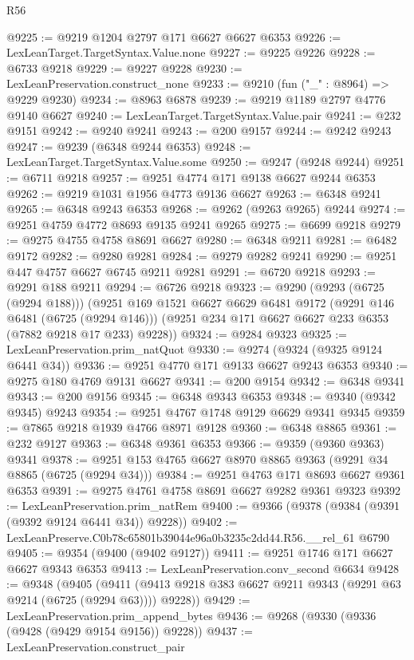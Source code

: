 \begin{lexlean}{R56}
\begin{coremodule}
@9225 := @9219 @1204 @2797 @171 @6627 @6627 @6353
@9226 := LexLeanTarget.TargetSyntax.Value.none
@9227 := @9225 @9226
@9228 := @6733 @9218
@9229 := @9227 @9228
@9230 := LexLeanPreservation.construct_none
@9233 := @9210 (fun ("_" : @8964) => @9229 @9230)
@9234 := @8963 @6878
@9239 := @9219 @1189 @2797 @4776 @9140 @6627
@9240 := LexLeanTarget.TargetSyntax.Value.pair
@9241 := @232 @9151
@9242 := @9240 @9241
@9243 := @200 @9157
@9244 := @9242 @9243
@9247 := @9239 (@6348 @9244 @6353)
@9248 := LexLeanTarget.TargetSyntax.Value.some
@9250 := @9247 (@9248 @9244)
@9251 := @6711 @9218
@9257 := @9251 @4774 @171 @9138 @6627 @9244 @6353
@9262 := @9219 @1031 @1956 @4773 @9136 @6627
@9263 := @6348 @9241
@9265 := @6348 @9243 @6353
@9268 := @9262 (@9263 @9265) @9244
@9274 := @9251 @4759 @4772 @8693 @9135 @9241 @9265
@9275 := @6699 @9218
@9279 := @9275 @4755 @4758 @8691 @6627
@9280 := @6348 @9211
@9281 := @6482 @9172
@9282 := @9280 @9281
@9284 := @9279 @9282 @9241
@9290 := @9251 @447 @4757 @6627 @6745 @9211 @9281
@9291 := @6720 @9218
@9293 := @9291 @188 @9211
@9294 := @6726 @9218
@9323 := @9290
    (@9293 (@6725 (@9294 @188)))
    (@9251
      @169
      @1521
      @6627
      @6629
      @6481
      @9172
      (@9291 @146 @6481 (@6725 (@9294 @146)))
      (@9251 @234 @171 @6627 @6627 @233 @6353 (@7882 @9218 @17 @233) @9228))
@9324 := @9284 @9323
@9325 := LexLeanPreservation.prim_natQuot
@9330 := @9274 (@9324 (@9325 @9124 @6441 @34))
@9336 := @9251 @4770 @171 @9133 @6627 @9243 @6353
@9340 := @9275 @180 @4769 @9131 @6627
@9341 := @200 @9154
@9342 := @6348 @9341
@9343 := @200 @9156
@9345 := @6348 @9343 @6353
@9348 := @9340 (@9342 @9345) @9243
@9354 := @9251 @4767 @1748 @9129 @6629 @9341 @9345
@9359 := @7865 @9218 @1939 @4766 @8971 @9128
@9360 := @6348 @8865
@9361 := @232 @9127
@9363 := @6348 @9361 @6353
@9366 := @9359 (@9360 @9363) @9341
@9378 := @9251 @153 @4765 @6627 @8970 @8865 @9363 (@9291 @34 @8865 (@6725 (@9294 @34)))
@9384 := @9251 @4763 @171 @8693 @6627 @9361 @6353
@9391 := @9275 @4761 @4758 @8691 @6627 @9282 @9361 @9323
@9392 := LexLeanPreservation.prim_natRem
@9400 := @9366 (@9378 (@9384 (@9391 (@9392 @9124 @6441 @34)) @9228))
@9402 := LexLeanPreserve.C0b78c65801b39044e96a0b3235c2dd44.R56.__rel_61 @6790
@9405 := @9354 (@9400 (@9402 @9127))
@9411 := @9251 @1746 @171 @6627 @6627 @9343 @6353
@9413 := LexLeanPreservation.conv_second @6634
@9428 := @9348
    (@9405 (@9411 (@9413 @9218 @383 @6627 @9211 @9343 (@9291 @63 @9214 (@6725 (@9294 @63)))) @9228))
@9429 := LexLeanPreservation.prim_append_bytes
@9436 := @9268 (@9330 (@9336 (@9428 (@9429 @9154 @9156)) @9228))
@9437 := LexLeanPreservation.construct_pair

\end{coremodule}
\end{lexlean}
